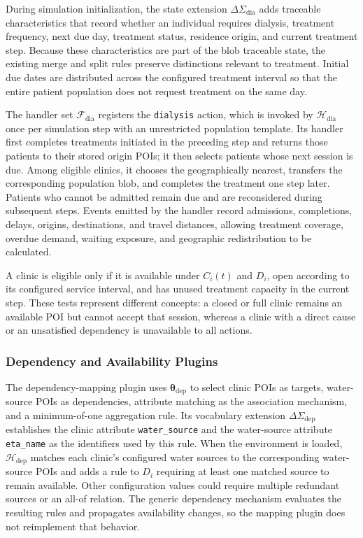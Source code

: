 During simulation initialization, the state extension $\Delta\Sigma_{\mathrm{dia}}$ adds traceable characteristics that record whether an individual requires dialysis, treatment frequency, next due day, treatment status, residence origin, and current treatment step. Because these characteristics are part of the blob traceable state, the existing merge and split rules preserve distinctions relevant to treatment. Initial due dates are distributed across the configured treatment interval so that the entire patient population does not request treatment on the same day.
 

The handler set $\mathcal{F}_{\mathrm{dia}}$ registers the \texttt{dialysis} action, which is invoked by $\mathcal{H}_{\mathrm{dia}}$ once per simulation step with an unrestricted population template. Its handler first completes treatments initiated in the preceding step and returns those patients to their stored origin POIs; it then selects patients whose next session is due. Among eligible clinics, it chooses the geographically nearest, transfers the corresponding population blob, and completes the treatment one step later. Patients who cannot be admitted remain due and are reconsidered during subsequent steps. Events emitted by the handler record admissions, completions, delays, origins, destinations, and travel distances, allowing treatment coverage, overdue demand, waiting exposure, and geographic redistribution to be calculated.

A clinic is eligible only if it is available under $C_i(t)$ and $D_i$, open according to its configured service interval, and has unused treatment capacity in the current step. These tests represent different concepts: a closed or full clinic remains an available POI but cannot accept that session, whereas a clinic with a direct cause or an unsatisfied dependency is unavailable to all actions.

\subsubsection{Dependency and Availability Plugins}

The dependency-mapping plugin uses $\bm{\theta}_{\mathrm{dep}}$ to select clinic POIs as targets, water-source POIs as dependencies, attribute matching as the association mechanism, and a minimum-of-one aggregation rule. Its vocabulary extension $\Delta\Sigma_{\mathrm{dep}}$ establishes the clinic attribute \texttt{water\_source} and the water-source attribute \texttt{eta\_name} as the identifiers used by this rule. When the environment is loaded, $\mathcal{H}_{\mathrm{dep}}$ matches each clinic's configured water sources to the corresponding water-source POIs and adds a rule to $D_i$ requiring at least one matched source to remain available. Other configuration values could require multiple redundant sources or an all-of relation. The generic dependency mechanism evaluates the resulting rules and propagates availability changes, so the mapping plugin does not reimplement that behavior.

